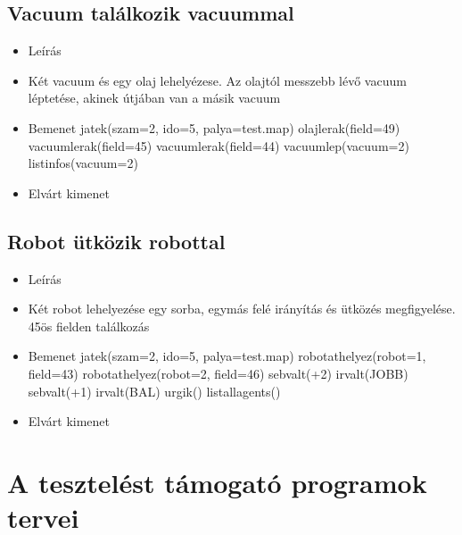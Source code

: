 \subsection{Vacuum találkozik vacuummal}
\begin{itemize}
	\item Leírás\newline
	\item Két vacuum és egy olaj lehelyézese. Az olajtól messzebb lévő vacuum léptetése, akinek útjában van a másik vacuum
	\item Bemenet\newline
		jatek(szam=2, ido=5, palya=test.map) \newline
		olajlerak(field=49) \newline
		vacuumlerak(field=45) \newline
		vacuumlerak(field=44) \newline
		vacuumlep(vacuum=2) \newline
		listinfos(vacuum=2) \newline
	\item Elvárt kimenet\newline
\end{itemize}

\subsection{Robot ütközik robottal}
\begin{itemize}
	\item Leírás\newline
	\item Két robot lehelyezése egy sorba, egymás felé irányítás és ütközés megfigyelése. 45ös fielden találkozás
	\item Bemenet\newline
	jatek(szam=2, ido=5, palya=test.map) \newline
	robotathelyez(robot=1, field=43) \newline
	robotathelyez(robot=2, field=46) \newline	
	sebvalt(+2) \newline
	irvalt(JOBB) \newline
	sebvalt(+1) \newline
	irvalt(BAL) \newline
	urgik() \newline
	listallagents() \newline
	\item Elvárt kimenet\newline
\end{itemize}

\section{A tesztelést támogató programok tervei}


